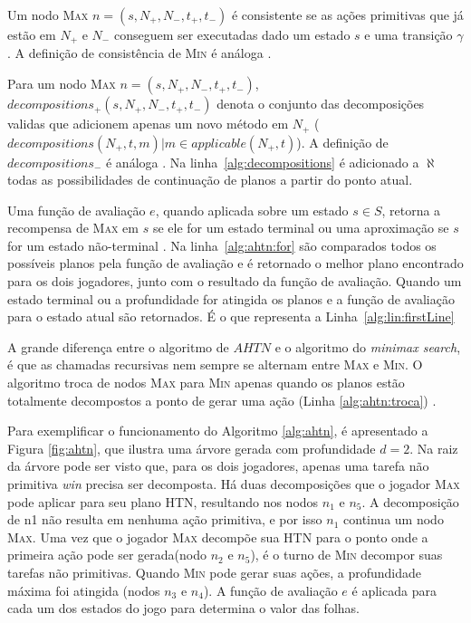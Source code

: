 Um nodo \textsc{Max} $n = (s, N_{+}, N_{-}, t_{+}, t_{-})$ é consistente se as ações primitivas que já estão em $N_{+}$ e $N_{-}$ conseguem ser executadas dado um estado $s$ e uma transição $\gamma$. 
A definição de consistência de \textsc{Min} é análoga \cite{ontanon2015adversarial}. 

Para um nodo \textsc{Max} $n = (s, N_{+}, N_{-}, t_{+}, t_{-})$, $decompositions_{+}(s, N_{+}, N_{-}, t_{+}, t_{-})$ denota o conjunto das decomposições validas que adicionem apenas um novo método em $N_{+}$ (${decompositions(N_{+}, t, m) | m \in applicable(N_{+}, t)}$).
A definição de $decompositions_{-}$ é análoga \cite{ontanon2015adversarial}. 
Na linha~\ref{alg:decompositions} é adicionado a $\aleph$ todas as possibilidades de continuação de planos a partir do ponto atual. 

Uma função de avaliação $e$, quando aplicada sobre um estado $s \in S$, retorna a recompensa de \textsc{Max} em $s$ se ele for um estado terminal ou uma aproximação se $s$ for um estado não-terminal \cite{ontanon2015adversarial}.  
Na linha~\ref{alg:ahtn:for} são comparados todos os possíveis planos pela função de avaliação e é retornado o melhor plano encontrado para os dois jogadores, junto com o resultado da função de avaliação. 
Quando um estado terminal ou a profundidade for atingida os planos e a função de avaliação para o estado atual são retornados. 
É o que representa a Linha~\ref{alg:lin:firstLine} 

A grande diferença entre o algoritmo de $AHTN$ e o algoritmo do \textit{minimax search}, é que as chamadas recursivas nem sempre se alternam entre \textsc{Max} e \textsc{Min}. 
O algoritmo troca de nodos \textsc{Max} para \textsc{Min} apenas quando os planos estão totalmente decompostos a ponto de gerar uma ação (Linha \ref{alg:ahtn:troca}) \cite{ontanon2015adversarial}.

Para exemplificar o funcionamento do Algoritmo \ref{alg:ahtn}, é apresentado a Figura \ref{fig:ahtn}, que ilustra uma árvore gerada com profundidade $d = 2$. 
Na raiz da árvore pode ser visto que, para os dois jogadores, apenas uma tarefa não primitiva \textit{win} precisa ser decomposta. 
Há duas decomposições que o jogador \textsc{Max} pode aplicar para seu plano HTN, resultando nos nodos $n_{1}$ e $n_{5}$. 
A decomposição de n1 não resulta em nenhuma ação primitiva, e por isso $n_{1}$ continua um nodo \textsc{Max}. 
Uma vez que o jogador \textsc{Max} decompõe sua HTN para o ponto onde a primeira ação pode ser gerada(nodo $n_{2}$ e $n_{5}$), é o turno de \textsc{Min} decompor suas tarefas não primitivas. Quando \textsc{Min} pode gerar suas ações, a profundidade máxima foi atingida (nodos $n_{3}$ e $n_{4}$). 
A função de avaliação $e$ é aplicada para cada um dos estados do jogo para determina o valor das folhas.

